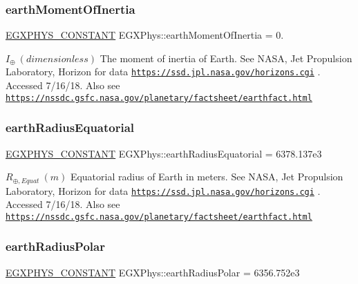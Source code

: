\subsubsection{\texorpdfstring{earth\+Moment\+Of\+Inertia}{earthMomentOfInertia}}
{\footnotesize\ttfamily \mbox{\hyperlink{group___e_g_x_phys-_constants-_macros_ga76980d288494ce1714c9ac68a95ba702}{E\+G\+X\+P\+H\+Y\+S\+\_\+\+C\+O\+N\+S\+T\+A\+NT}} E\+G\+X\+Phys\+::earth\+Moment\+Of\+Inertia = 0.}

$ I_{\oplus} \ (dimensionless)$ The moment of inertia of Earth. See N\+A\+SA, Jet Propulsion Laboratory, Horizon for data \href{https://ssd.jpl.nasa.gov/horizons.cgi}{\tt https\+://ssd.\+jpl.\+nasa.\+gov/horizons.\+cgi} . Accessed 7/16/18. Also see \href{https://nssdc.gsfc.nasa.gov/planetary/factsheet/earthfact.html}{\tt https\+://nssdc.\+gsfc.\+nasa.\+gov/planetary/factsheet/earthfact.\+html} \mbox{\label{group___e_g_x_phys-_constants-_astrophysics-_solar_system-_earth-_bulk_ga44f4484850300ac8c26488514864fb47}} 
\subsubsection{\texorpdfstring{earth\+Radius\+Equatorial}{earthRadiusEquatorial}}
{\footnotesize\ttfamily \mbox{\hyperlink{group___e_g_x_phys-_constants-_macros_ga76980d288494ce1714c9ac68a95ba702}{E\+G\+X\+P\+H\+Y\+S\+\_\+\+C\+O\+N\+S\+T\+A\+NT}} E\+G\+X\+Phys\+::earth\+Radius\+Equatorial = 6378.\+137e3}

$R_{\oplus,Equat} \ (m)$ Equatorial radius of Earth in meters. See N\+A\+SA, Jet Propulsion Laboratory, Horizon for data \href{https://ssd.jpl.nasa.gov/horizons.cgi}{\tt https\+://ssd.\+jpl.\+nasa.\+gov/horizons.\+cgi} . Accessed 7/16/18. Also see \href{https://nssdc.gsfc.nasa.gov/planetary/factsheet/earthfact.html}{\tt https\+://nssdc.\+gsfc.\+nasa.\+gov/planetary/factsheet/earthfact.\+html} \mbox{\label{group___e_g_x_phys-_constants-_astrophysics-_solar_system-_earth-_bulk_gaa5213443d0c8577a2bfef89193346764}} 
\subsubsection{\texorpdfstring{earth\+Radius\+Polar}{earthRadiusPolar}}
{\footnotesize\ttfamily \mbox{\hyperlink{group___e_g_x_phys-_constants-_macros_ga76980d288494ce1714c9ac68a95ba702}{E\+G\+X\+P\+H\+Y\+S\+\_\+\+C\+O\+N\+S\+T\+A\+NT}} E\+G\+X\+Phys\+::earth\+Radius\+Polar = 6356.\+752e3}

